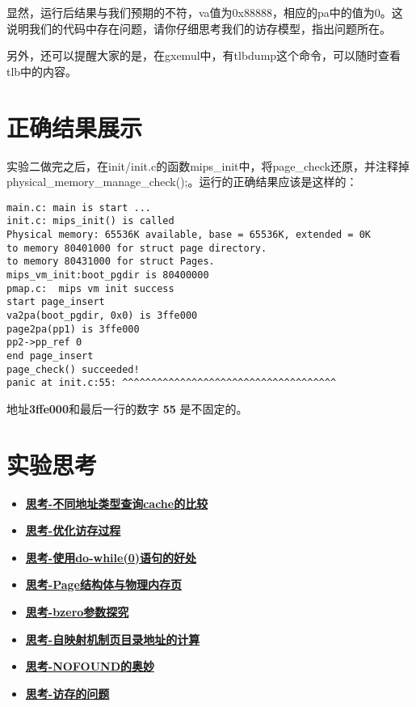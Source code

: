   \begin{thinking}\label{think-memory-access}
  显然，运行后结果与我们预期的不符，va值为0x88888，相应的pa中的值为0。这说明我们的代码中存在问题，请你仔细思考我们的访存模型，指出问题所在。
  \end{thinking}
  另外，还可以提醒大家的是，在gxemul中，有tlbdump这个命令，可以随时查看tlb中的内容。
\section{正确结果展示}

实验二做完之后，在init/init.c的函数mips\_init中，将page\_check还原，并注释掉physical\_memory\_manage\_check();。运行的正确结果应该是这样的：

\begin{verbatim}
main.c: main is start ...
init.c: mips_init() is called
Physical memory: 65536K available, base = 65536K, extended = 0K
to memory 80401000 for struct page directory.
to memory 80431000 for struct Pages.
mips_vm_init:boot_pgdir is 80400000
pmap.c:  mips vm init success
start page_insert
va2pa(boot_pgdir, 0x0) is 3ffe000
page2pa(pp1) is 3ffe000
pp2->pp_ref 0
end page_insert
page_check() succeeded!
panic at init.c:55: ^^^^^^^^^^^^^^^^^^^^^^^^^^^^^^^^^^^^^
\end{verbatim}

地址\textbf{3ffe000}和最后一行的数字 \textbf{55} 是不固定的。

\section{实验思考}

\begin{itemize}
\item \hyperref[think-cache]{\textbf{\textcolor{baseB}{思考-不同地址类型查询cache的比较}}}
\item \hyperref[think-memory-access]{\textbf{\textcolor{baseB}{思考-优化访存过程}}}
\item \hyperref[think-do_while]{\textbf{\textcolor{baseB}{思考-使用do-while(0)语句的好处}}}
\item \hyperref[think-struct-page]{\textbf{\textcolor{baseB}{思考-Page结构体与物理内存页}}}
\item \hyperref[think-bzero]{\textbf{\textcolor{baseB}{思考-bzero参数探究}}}
\item \hyperref[think-windows_pde_addr]{\textbf{\textcolor{baseB}{思考-自映射机制页目录地址的计算}}}
\item \hyperref[think-tlb]{\textbf{\textcolor{baseB}{思考-NOFOUND的奥妙}}}
\item \hyperref[think-memory-access]{\textbf{\textcolor{baseB}{思考-访存的问题}}}
\end{itemize}

